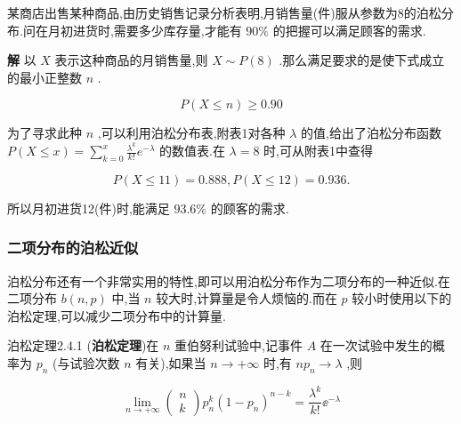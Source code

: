 \begin{example}\label{exam:2.4.5}
	某商店出售某种商品,由历史销售记录分析表明,月销售量(件)服从参数为8的泊松分布.问在月初进货时,需要多少库存量,才能有 $ 90\% $ 的把握可以满足顾客的需求.
	
	\textbf{解}
	以 $ X $ 表示这种商品的月销售量,则 $ X \sim P(8) $ .那么满足要求的是使下式成立的最小正整数 $ n $ .
	
	\[
	P(X \leqslant n) \geqslant 0.90
	\]
	
	为了寻求此种 $ n $ ,可以利用泊松分布表,附表1对各种 $ \lambda $ 的值,给出了泊松分布函数 $ P(X \leqslant x)=\sum_{k=0}^{x} \frac{\lambda^{k}}{k !} e^{-\lambda} $ 的数值表.在 $ \lambda=8 $ 时,可从附表1中查得
	
	\[
	P(X \leqslant 11)=0.888, P(X \leqslant 12)=0.936 .
	\]
	
	所以月初进货12(件)时,能满足 $ 93.6\% $ 的顾客的需求.
\end{example}

\subsubsection{二项分布的泊松近似}

泊松分布还有一个非常实用的特性,即可以用泊松分布作为二项分布的一种近似.在二项分布 $ b(n,p) $ 中,当 $ n $ 较大时,计算量是令人烦恼的.而在 $ p $ 较小时使用以下的泊松定理,可以减少二项分布中的计算量.

\begin{theorem}{泊松定理}{2.4.1}
	(\textbf{泊松定理})在 $ n $ 重伯努利试验中,记事件 $ A $ 在一次试验中发生的概率为 $ p_{n} $ (与试验次数 $ n $ 有关),如果当 $ n \rightarrow+\infty $ 时,有 $ n p_{n} \rightarrow \lambda $ ,则
	
	\begin{equation}
	\lim _{n \rightarrow+\infty} \left( \begin{array}{l}{n} \\ {k}\end{array}\right) p_{n}^{k}\left(1-p_{n}\right)^{n-k}=\frac{\lambda^{k}}{k !} \ee ^{-\lambda} \label{eq:2.4.4}
	\end{equation}
	
\end{theorem}

